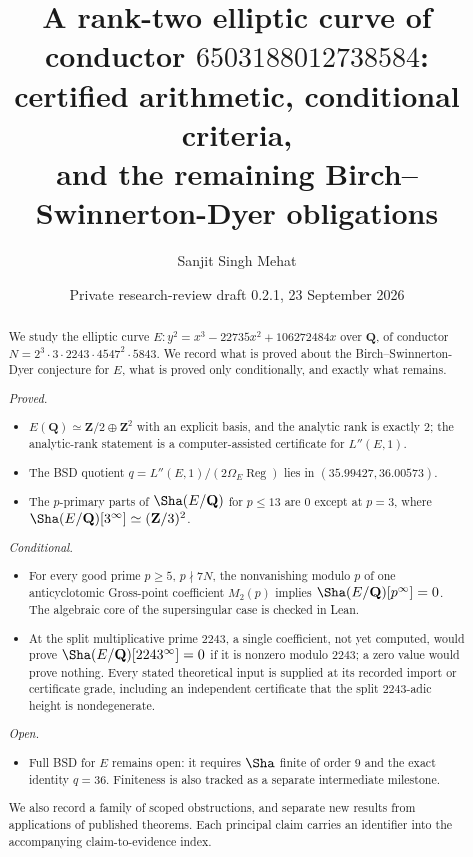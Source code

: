 \documentclass[11pt]{amsart}
\title[A rank-two elliptic curve: certified arithmetic and remaining BSD obligations]{A rank-two elliptic curve of conductor $6503188012738584$:\\ certified arithmetic, conditional criteria,\\ and the remaining Birch--Swinnerton-Dyer obligations}
\author{Sanjit Singh Mehat}
\date{Private research-review draft 0.2.1, 23 September 2026}
\newcommand{\Q}{\mathbf{Q}}
\newcommand{\Z}{\mathbf{Z}}
\newcommand{\Reg}{\operatorname{Reg}}
\theoremstyle{plain}
\theoremstyle{definition}
\theoremstyle{remark}
\begin{document}
\begin{abstract}
We study the elliptic curve $E\colon y^2=x^3-22735x^2+106272484x$ over $\Q$, of conductor $N=2^3\cdot3\cdot2243\cdot4547^2\cdot5843$. We record what is proved about the Birch--Swinnerton-Dyer conjecture for $E$, what is proved only conditionally, and exactly what remains.

\emph{Proved.}
\begin{itemize}[leftmargin=*]
\item $E(\Q)\simeq\Z/2\oplus\Z^2$ with an explicit basis, and the analytic rank is exactly $2$; the analytic-rank statement is a computer-assisted certificate for $L''(E,1)$.
\item The BSD quotient $q=L''(E,1)/(2\Omega_E\Reg)$ lies in $(35.99427,36.00573)$.
\item The $p$-primary parts of $\Sha(E/\Q)$ for $p\le13$ are $0$ except at $p=3$, where $\Sha(E/\Q)[3^\infty]\simeq(\Z/3)^2$.
\end{itemize}

\emph{Conditional.}
\begin{itemize}[leftmargin=*]
\item For every good prime $p\ge5$, $p\nmid7N$, the nonvanishing modulo $p$ of one anticyclotomic Gross-point coefficient $M_2(p)$ implies $\Sha(E/\Q)[p^\infty]=0$. The algebraic core of the supersingular case is checked in Lean.
\item At the split multiplicative prime $2243$, a single coefficient, not yet computed, would prove $\Sha(E/\Q)[2243^\infty]=0$ if it is nonzero modulo $2243$; a zero value would prove nothing. Every stated theoretical input is supplied at its recorded import or certificate grade, including an independent certificate that the split $2243$-adic height is nondegenerate.
\end{itemize}

\emph{Open.}
\begin{itemize}[leftmargin=*]
\item Full BSD for $E$ remains open: it requires $\Sha$ finite of order $9$ and the exact identity $q=36$. Finiteness is also tracked as a separate intermediate milestone.
\end{itemize}

We also record a family of scoped obstructions, and separate new results from applications of published theorems. Each principal claim carries an identifier into the accompanying claim-to-evidence index.
\end{abstract}
\end{document}
